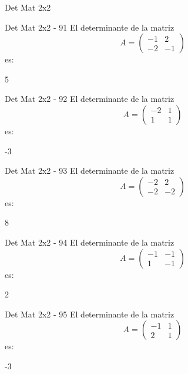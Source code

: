 \documentclass[a4,11pt]{aleph-notas}
\begin{document}
\begin{quiz}{Det Mat 2x2}
\begin{numerical}[tolerance=0]%
    {Det Mat 2x2 - 91}
    El determinante de la matriz
    \[
        A = \begin{pmatrix} -1 & 2 \\ -2 & -1 \end{pmatrix}
    \]
    es:
    \item[] 5
\end{numerical}

\begin{numerical}[tolerance=0]%
    {Det Mat 2x2 - 92}
    El determinante de la matriz
    \[
        A = \begin{pmatrix} -2 & 1 \\ 1 & 1 \end{pmatrix}
    \]
    es:
    \item[] -3
\end{numerical}

\begin{numerical}[tolerance=0]%
    {Det Mat 2x2 - 93}
    El determinante de la matriz
    \[
        A = \begin{pmatrix} -2 & 2 \\ -2 & -2 \end{pmatrix}
    \]
    es:
    \item[] 8
\end{numerical}

\begin{numerical}[tolerance=0]%
    {Det Mat 2x2 - 94}
    El determinante de la matriz
    \[
        A = \begin{pmatrix} -1 & -1 \\ 1 & -1 \end{pmatrix}
    \]
    es:
    \item[] 2
\end{numerical}

\begin{numerical}[tolerance=0]%
    {Det Mat 2x2 - 95}
    El determinante de la matriz
    \[
        A = \begin{pmatrix} -1 & 1 \\ 2 & 1 \end{pmatrix}
    \]
    es:
    \item[] -3
\end{numerical}


\end{quiz}
\end{document}
